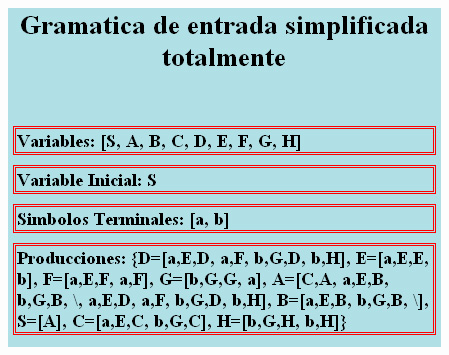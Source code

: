 \documentclass[12pt,a4paper,spanish]{book}
\begin{document}
\begin{center}
\includegraphics[scale=0.5]{entradafinsimp.jpg}\\
\end{center}
\end{document}
